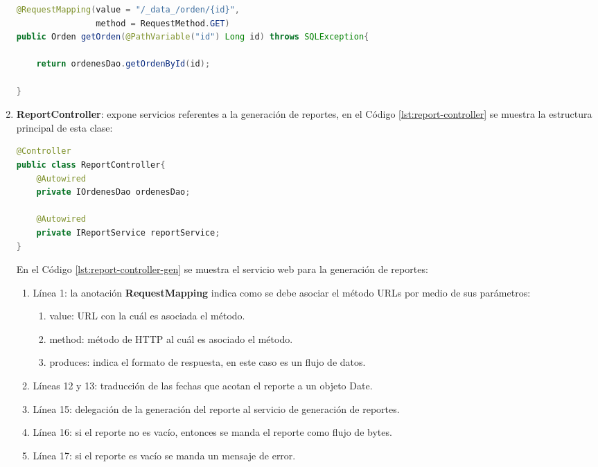 \begin{enumerate}
\begin{lstlisting}[language=Java, caption={Servicio Web para obtener una orden de reposición.}, captionpos=b, label={lst:get-orden-data-controller}]
@RequestMapping(value = "/_data_/orden/{id}",
				method = RequestMethod.GET)
public Orden getOrden(@PathVariable("id") Long id) throws SQLException{

	return ordenesDao.getOrdenById(id);

}
\end{lstlisting}

	\item \textbf{ReportController}: expone servicios referentes a la generación de reportes, en el Código \ref{lst:report-controller} se muestra la estructura principal de esta clase:
\begin{lstlisting}[language=Java, caption={Controlador para exponer servicios Web de generación de reportes.}, captionpos=b, label={lst:report-controller}]
@Controller
public class ReportController{
	@Autowired
	private IOrdenesDao ordenesDao;
	
	@Autowired
	private IReportService reportService;
}
\end{lstlisting}

	En el Código \ref{lst:report-controller-gen} se muestra el servicio web para la generación de reportes:
	\begin{enumerate}
		\item Línea 1: la anotación \textbf{RequestMapping} indica como se debe asociar el método URLs por medio de sus parámetros:
		\begin{enumerate}
			\item value: URL con la cuál es asociada el método.
			\item method: método de HTTP al cuál es asociado el método.
			\item produces: indica el formato de respuesta, en este caso es un flujo de datos.
		\end{enumerate}
		\item Líneas 12 y 13: traducción de las fechas que acotan el reporte a un objeto Date.
		\item Línea 15: delegación de la generación del reporte al servicio de generación de reportes.
		\item Línea 16: si el reporte no es vacío, entonces se manda el reporte como flujo de bytes.
		\item Línea 17: si el reporte es vacío se manda un mensaje de error.
	\end{enumerate}


\end{enumerate}
